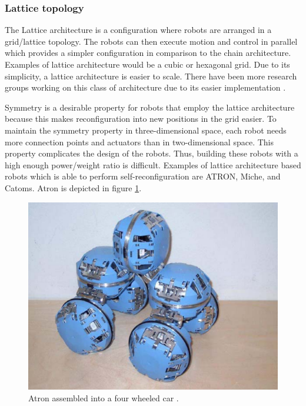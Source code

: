 \subsubsection{Lattice topology}
The Lattice architecture is a configuration where robots are arranged in a grid/lattice topology.
The robots can then execute motion and control in parallel which provides a simpler configuration in comparison to the chain architecture. 
Examples of lattice architecture would be a cubic or hexagonal grid.
Due to its simplicity, a lattice architecture is easier to scale. 
There have been more research groups working on this class of architecture due to its easier implementation \cite{yim_modular_2002}.

Symmetry is a desirable property for robots that employ the lattice architecture because this makes reconfiguration into new positions in the grid easier.
To maintain the symmetry property in three-dimensional space, each robot needs more connection points and actuators than in two-dimensional space\cite{murata_self-reconfigurable_2007}.
This property complicates the design of the robots. 
Thus, building these robots with a high enough power/weight ratio is difficult.
Examples of lattice architecture based robots which is able to perform self-reconfiguration are ATRON\cite{brandt_atron_2007}, Miche\cite{gilpin_miche:_2008}, and Catoms\cite{kirby_catoms:_2005}.
Atron is depicted in figure \ref{fig:atron}.

\begin{figure}[H]
	\centering
	\includegraphics[scale=0.5]{chapters/res/Atron.png}
	\caption{Atron assembled into a four wheeled car \cite{brandt_atron_2007}.}
	\label{fig:atron}
\end{figure}

